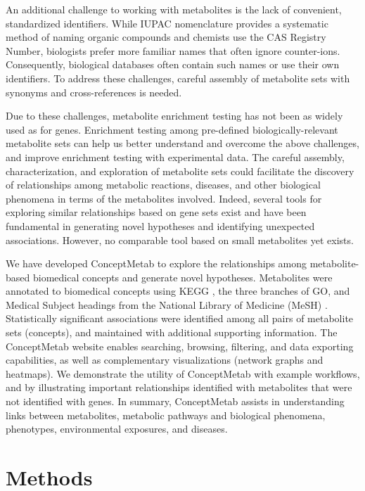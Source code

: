 An additional challenge to working with metabolites is the lack of convenient, standardized identifiers. While IUPAC nomenclature provides a systematic method of naming organic compounds and chemists use the CAS Registry Number, biologists prefer more familiar names that often ignore counter-ions. Consequently, biological databases often contain such names or use their own identifiers. To address these challenges, careful assembly of metabolite sets with synonyms and cross-references is needed.

Due to these challenges, metabolite enrichment testing has not been as widely used as for genes. Enrichment testing among pre-defined biologically-relevant metabolite sets can help us better understand and overcome the above challenges, and improve enrichment testing with experimental data. The careful assembly, characterization, and exploration of metabolite sets could facilitate the discovery of relationships among metabolic reactions, diseases, and other biological phenomena in terms of the metabolites involved. Indeed, several tools for exploring similar relationships based on gene sets exist \cite{Araki:2012bv, PerezLlamas:2011ju, Rhodes:2007bd, Sartor:2010fo} and have been fundamental in generating novel hypotheses and identifying unexpected associations. However, no comparable tool based on small metabolites yet exists.

We have developed ConceptMetab to explore the relationships among metabolite-based biomedical concepts and generate novel hypotheses. Metabolites were annotated to biomedical concepts using KEGG \cite{Kanehisa:2011fz}, the three branches of GO, and Medical Subject headings from the National Library of Medicine (MeSH) \cite{Coletti:2001gv}. Statistically significant associations were identified among all pairs of metabolite sets (concepts), and maintained with additional supporting information. The ConceptMetab website enables searching, browsing, filtering, and data exporting capabilities, as well as complementary visualizations (network graphs and heatmaps). We demonstrate the utility of ConceptMetab with example workflows, and by illustrating important relationships identified with metabolites that were not identified with genes. In summary, ConceptMetab assists in understanding links between metabolites, metabolic pathways and biological phenomena, phenotypes, environmental exposures, and diseases.

\section{Methods}
\label{conceptmetab_methods}

